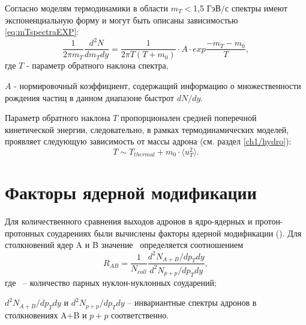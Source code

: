 Согласно моделям термодинамики \cite{Thermal1, Thermal2} в области $m_T<$1,5 ГэВ/с спектры имеют экспоненциальную форму и могут быть описаны  зависимостью \ref{eq:mTspectraEXP}:
\begin{equation}
	\label{eq:mTspectraEXP}
	\frac{1}{2\pi m_T} \frac{d^2 N}{dm_T dy}=\frac{1}{2\pi T (T+m_0)}\cdot A \cdot exp{\frac{-m_T -m_0}{T}},
\end{equation}
где $T$ - параметр обратного наклона спектра,

$A$ - нормировочный коэффициент, содержащий информацию о множественности рождения частиц в данном диапазоне быстрот $dN/dy$.

Параметр обратного наклона $T$ пропорционален средней поперечной кинетической энергии, следовательно, в рамках термодинамических моделей, проявляет следующую зависимость от массы адрона (см. раздел \ref{ch1/hydro}):
$$ T \sim T_{thermal}+m_0 \cdot \langle u_T ^2 \rangle.$$


\section{Факторы ядерной модификации}
Для количественного сравнения выходов адронов в ядро-ядерных и протон-протонных соударениях были вычислены факторы ядерной модификации (\rab). Для столкновений ядер A и B значение \rab \ определяется соотношением
\begin{equation}
	\label{eq:rab}
	R_{AB}=\frac{1}{N_{coll}}\frac{d^2 N_{A+B}/dp_T dy}{d^2 N_{p+p}/dp_T dy},
\end{equation}
где \Ncoll \ – количество парных нуклон-нуклонных соударений;
 
$d^2 N_{A+B}/dp_T dy$ и $d^2 N_{p+p}/dp_T dy$ – инвариантные спектры адронов в столкновениях A+B и $p+p$ соответственно.



